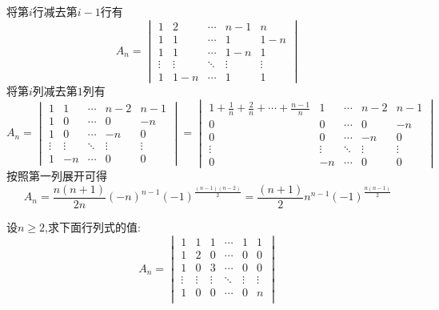 \documentclass{ctexart}
\begin{document}
\begin{solution}
    将第$i$行减去第$i-1$行有
    \[A_n=\begin{vmatrix}
        1&2&\cdots&n-1&n\\
        1&1&\cdots&1&1-n\\
        1&1&\cdots&1-n&1\\
        \vdots&\vdots&\ddots&\vdots&\vdots\\
        1&1-n&\cdots&1&1
    \end{vmatrix}\]
    将第$i$列减去第$1$列有
    \[A_n=\begin{vmatrix}
        1&1&\cdots&n-2&n-1\\
        1&0&\cdots&0&-n\\
        1&0&\cdots&-n&0\\
        \vdots&\vdots&\ddots&\vdots&\vdots\\
        1&-n&\cdots&0&0
    \end{vmatrix}=\begin{vmatrix}
        1+\frac{1}{n}+\frac{2}{n}+\cdots+\frac{n-1}{n}&1&\cdots&n-2&n-1\\
        0&0&\cdots&0&-n\\
        0&0&\cdots&-n&0\\
        \vdots&\vdots&\ddots&\vdots&\vdots\\
        0&-n&\cdots&0&0
    \end{vmatrix}\]
    按照第一列展开可得
    \[A_n=\dfrac{n(n+1)}{2n}(-n)^{n-1}(-1)^{\frac{(n-1)(n-2)}{2}}=\dfrac{(n+1)}{2}n^{n-1}(-1)^{\frac{n(n-1)}{2}}\]
\end{solution}
\begin{problem}
    设$n\geqslant2$,求下面行列式的值:
    \[A_n=\begin{vmatrix}
        1&1&1&\cdots&1&1\\
        1&2&0&\cdots&0&0\\
        1&0&3&\cdots&0&0\\
        \vdots&\vdots&\vdots&\ddots&\vdots&\vdots\\
        1&0&0&\cdots&0&n\\
    \end{vmatrix}\]
\end{problem}
\end{document}
